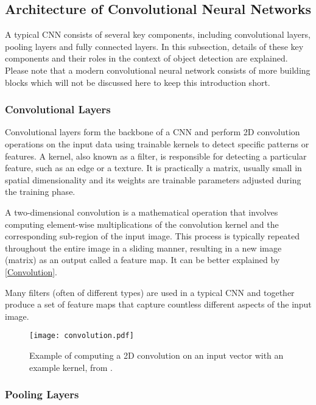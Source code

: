 \subsection{Architecture of Convolutional Neural Networks}

A typical CNN consists of several key components, including convolutional
layers, pooling layers and fully connected layers. In this subsection, details
of these key components and their roles in the context of object detection are
explained. Please note that a modern convolutional neural network consists of
more building blocks which will not be discussed here to keep this introduction
short.

\subsubsection{Convolutional Layers}

Convolutional layers form the backbone of a CNN and perform 2D convolution
operations on the input data using trainable kernels to detect specific patterns
or features. A kernel, also known as a filter, is responsible for detecting a
particular feature, such as an edge or a texture. It is practically a matrix,
usually small in spatial dimensionality and its weights are trainable parameters
adjusted during the training phase. \cite{OShea2015}

A two-dimensional convolution is a mathematical operation that involves
computing element-wise multiplications of the convolution kernel and the
corresponding sub-region of the input image. This process is typically repeated
throughout the entire image in a sliding manner, resulting in a new image
(matrix) as an output called a feature map. It can be better explained by
\autoref{Convolution}.

Many filters (often of different types) are used in a typical CNN and together
produce a set of feature maps that capture countless different aspects of the
input image.

\begin{figure}[h]
    \centering
    \texttt{[image: convolution.pdf]}
    \caption{Example of computing a 2D convolution on an input vector with an example kernel, from \cite{OShea2015}.}
    \label{Convolution}
\end{figure}


\subsubsection{Pooling Layers}

